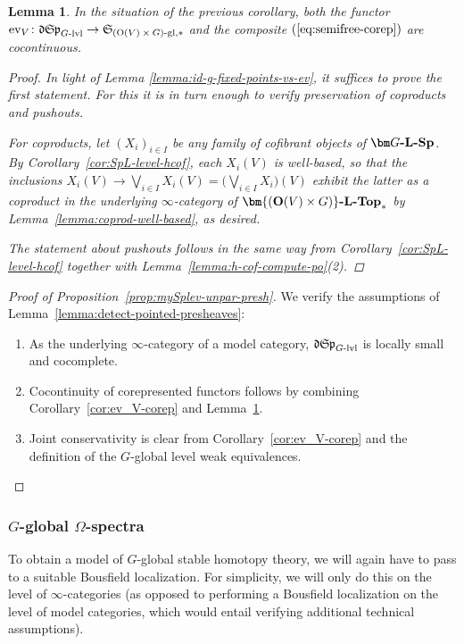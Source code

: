 \documentclass[reqno]{memo-l}
\theoremstyle{mythm}
\newtheorem{lemma}[thm]{Lemma}
\theoremstyle{definition}
\numberwithin{equation}{section}
\DeclareMathOperator{\ev}{ev}
\newcommand{\cat}[1]{\textbf{\textup{#1}}}
\renewcommand{\O}{{\textup{O}}}
\newcommand{\mySp}{{\mathfrak S\kern-.5pt\mathfrak p}}
\newcommand{\myLSp}{{\mathfrak d\kern-.25pt}\mySp}
\newcommand{\myS}{{{\mathfrak S\kern-.4pt}}}
\begin{document}
\begin{lemma}\label{lemma:ev_V-cc}
    In the situation of the previous corollary, both the functor $\ev_V\colon\myLSp_\textup{$G$-lvl}\to\myS_{\textup{$(\O(V)\times G)$-gl},*}$ and the composite $(\ref{eq:semifree-corep})$ are cocontinuous.
    \begin{proof}
        In light of Lemma \ref{lemma:id-g-fixed-points-vs-ev}, it suffices to prove the first statement. For this it is in turn enough to verify preservation of coproducts and pushouts.

        For coproducts, let $(X_i)_{i\in I}$ be any family of cofibrant objects of $\cat{$\bm G$-$\cat{L}$-Sp}$. By Corollary~\ref{cor:SpL-level-hcof}, each $X_i(V)$ is well-based, so that the inclusions $X_i(V)\to\bigvee_{i\in I}X_i(V)=\big(\bigvee_{i\in I}X_i\big)(V)$ exhibit the latter as a coproduct in the underlying $\infty$-category of $\cat{$\bm{(\O(V)\times G)}$-$\cat{L}$-Top}_*$ by Lemma~\ref{lemma:coprod-well-based}, as desired.

        The statement about pushouts follows in the same way from Corollary~\ref{cor:SpL-level-hcof} together with Lemma~\ref{lemma:h-cof-compute-po}(2).
    \end{proof}
\end{lemma}

\begin{proof}[Proof of Proposition~\ref{prop:mySplev-unpar-presh}]
    We verify the assumptions of Lemma~\ref{lemma:detect-pointed-presheaves}:
    \begin{enumerate}
        \item[(0)] As the underlying $\infty$-category of a model category, $\myLSp_\textup{$G$-lvl}$ is locally small and cocomplete.
        \item Cocontinuity of corepresented functors follows by combining Corollary~\ref{cor:ev_V-corep} and Lemma~\ref{lemma:ev_V-cc}.
        \item Joint conservativity is clear from Corollary~\ref{cor:ev_V-corep} and the definition of the $G$-global level weak equivalences.\qedhere
    \end{enumerate}
\end{proof}

\subsubsection{$G$-global $\Omega$-spectra} 
To obtain a model of $G$-global stable homotopy theory, we will again have to pass to a suitable Bousfield localization. For simplicity, we will only do this on the level of $\infty$-categories (as opposed to performing a Bousfield localization on the level of model categories, which would entail verifying additional technical assumptions).
\end{document}
